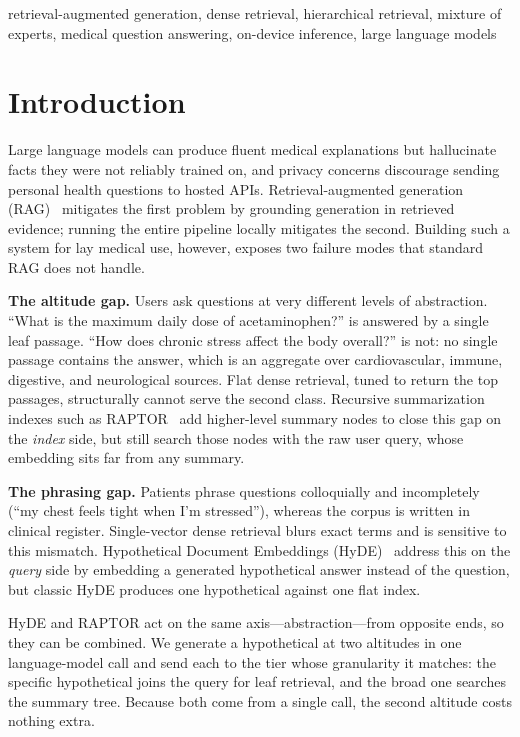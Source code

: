 \documentclass[conference]{IEEEtran}
\begin{document}
\begin{IEEEkeywords}
retrieval-augmented generation, dense retrieval, hierarchical retrieval,
mixture of experts, medical question answering, on-device inference,
large language models
\end{IEEEkeywords}

\section{Introduction}
Large language models can produce fluent medical explanations but hallucinate
facts they were not reliably trained on, and privacy concerns discourage sending
personal health questions to hosted APIs. Retrieval-augmented generation
(RAG)~\cite{lewis2020rag} mitigates the first problem by grounding generation in
retrieved evidence; running the entire pipeline locally mitigates the second.
Building such a system for lay medical use, however, exposes two failure modes
that standard RAG does not handle.

\textbf{The altitude gap.} Users ask questions at very different levels of
abstraction. ``What is the maximum daily dose of acetaminophen?'' is answered by
a single leaf passage. ``How does chronic stress affect the body overall?''
is not: no single passage contains the answer, which is an aggregate over
cardiovascular, immune, digestive, and neurological sources. Flat dense
retrieval, tuned to return the top passages, structurally cannot serve the
second class. Recursive summarization indexes such as
RAPTOR~\cite{sarthi2024raptor} add higher-level summary nodes to close this gap
on the \emph{index} side, but still search those nodes with the raw user query,
whose embedding sits far from any summary.

\textbf{The phrasing gap.} Patients phrase questions colloquially and
incompletely (``my chest feels tight when I'm stressed''), whereas the corpus is
written in clinical register. Single-vector dense retrieval blurs exact terms and
is sensitive to this mismatch. Hypothetical Document Embeddings
(HyDE)~\cite{gao2023hyde} address this on the \emph{query} side by embedding a
generated hypothetical answer instead of the question, but classic HyDE produces
one hypothetical against one flat index.

HyDE and RAPTOR act on the same axis---abstraction---from opposite ends, so they
can be combined. We generate a hypothetical at two altitudes in one
language-model call and send each to the tier whose granularity it matches: the
specific hypothetical joins the query for leaf retrieval, and the broad one
searches the summary tree. Because both come from a single call, the second
altitude costs nothing extra.
\end{document}
